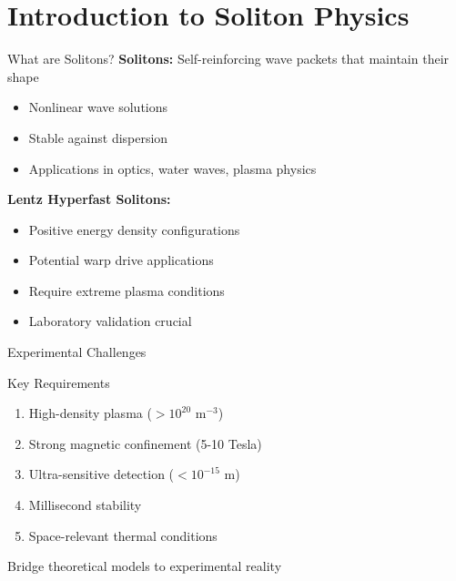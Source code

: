 \section{Introduction to Soliton Physics}

\begin{frame}{What are Solitons?}
    \textbf{Solitons:} Self-reinforcing wave packets that maintain their shape
    \begin{itemize}
        \item Nonlinear wave solutions
        \item Stable against dispersion
        \item Applications in optics, water waves, plasma physics
    \end{itemize}
    
    \vspace{0.5cm}
    \textbf{Lentz Hyperfast Solitons:}
    \begin{itemize}
        \item Positive energy density configurations
        \item Potential warp drive applications
        \item Require extreme plasma conditions
        \item Laboratory validation crucial
    \end{itemize}
\end{frame}

\begin{frame}{Experimental Challenges}
    \begin{block}{Key Requirements}
        \begin{enumerate}
            \item High-density plasma ($>10^{20}$ m$^{-3}$)
            \item Strong magnetic confinement (5-10 Tesla)
            \item Ultra-sensitive detection ($<10^{-15}$ m)
            \item Millisecond stability
            \item Space-relevant thermal conditions
        \end{enumerate}
    \end{block}
    
     Bridge theoretical models to experimental reality
\end{frame}

